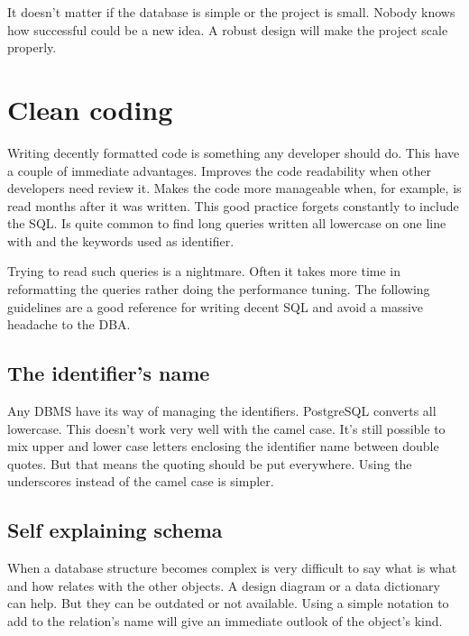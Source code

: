 It doesn't matter if the database is simple or the project is small. Nobody knows how successful could be 
a new idea. A robust design will make the project scale properly.

\section{Clean coding}
Writing decently formatted code is something any developer should do. This have a couple of immediate 
advantages. Improves the code readability when other developers need review it. Makes the code more 
manageable when, for example, is read months after it was written. This good practice forgets constantly 
to include the SQL. Is quite common to find long queries written all lowercase on one line with and the 
keywords used as identifier.\newline

Trying to read such queries is a nightmare. Often it takes more time in reformatting the queries rather 
doing the performance tuning. The following guidelines are a good reference for writing decent SQL and 
avoid a massive headache to the DBA.

\subsection{The identifier's name}
Any DBMS have its way of managing the identifiers. PostgreSQL converts all lowercase. This doesn't work very 
well with the camel case. It's still possible to mix upper and lower case letters enclosing the identifier 
name between double quotes. But that means the quoting should be put everywhere. Using the underscores 
instead of the camel case is simpler.

\subsection{Self explaining schema}
When a database structure becomes complex is very difficult to say what is what and how relates with the 
other objects. A design diagram or a data dictionary can help. But they can be outdated or not available. 
Using a simple notation to add to the relation's name will give an immediate outlook of the object's 
kind.\newline



